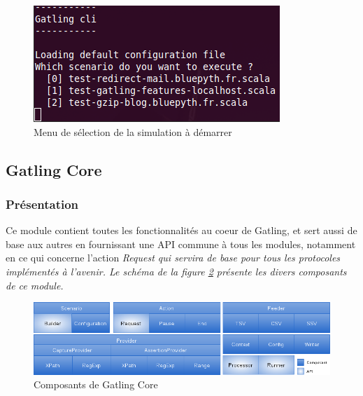 \begin{figure}[h]
\begin{center}
\includegraphics{img/menu_console.png}
\end{center}
\caption{Menu de sélection de la simulation à démarrer}
\label{menu_console}
\end{figure}

\subsection{Gatling Core}
\subsubsection{Présentation}
Ce module contient toutes les fonctionnalités au coeur de Gatling, et sert aussi de base aux autres en fournissant une API commune à tous les modules, notamment en ce qui concerne l'action \em{Request} qui servira de base pour tous les protocoles implémentés à l'avenir. Le schéma de la figure \ref{gatling_core} présente les divers composants de ce module.

\begin{figure}[h]
\begin{center}
\includegraphics[width=400pt]{img/gatling_core.png}
\end{center}
\caption{Composants de Gatling Core}
\label{gatling_core}
\end{figure}

